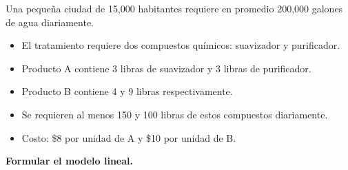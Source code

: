 \begin{Ejer} Una peque\~na ciudad de 15,000 habitantes requiere en promedio 200,000 galones de agua diariamente.

\begin{itemize}
\item[a) ] El tratamiento requiere dos compuestos qu\'imicos: suavizador y purificador.

\item[b) ] Producto A contiene 3 libras de suavizador y 3 libras de purificador.  
\item[c) ] Producto B contiene 4 y 9 libras respectivamente.

\item[d) ] Se requieren al menos 150 y 100 libras de estos compuestos diariamente.

\item[e) ] Costo: \$8 por unidad de A y \$10 por unidad de B.
\end{itemize}
\textbf{Formular el modelo lineal.}
\end{Ejer}

